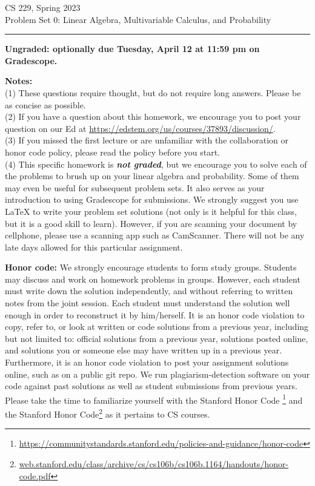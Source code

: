 \documentclass{article}
\newcommand{\ruleskip}{\bigskip\hrule\bigskip}
\begin{document}
\pagestyle{myheadings} 


{\huge
\noindent CS 229, Spring 2023\\
Problem Set 0: Linear Algebra, Multivariable Calculus, and Probability\\
}

\solutionstrue

\ruleskip

{\bf Ungraded: optionally due Tuesday, April 12 at 11:59 pm on Gradescope.}

{\bf Notes:} \\ (1) These questions require thought, but do not require long
answers. Please be as concise as possible. \\ (2) If you have a question about
this homework, we encourage you to post your question on our Ed at \url{https://edstem.org/us/courses/37893/discussion/}.  \\ (3) If you missed the
first lecture or are unfamiliar with the collaboration or honor code policy,
please read the policy before you start. \\ (4) This specific homework is {\bf{\emph{not graded}}}, but we encourage you
to solve each of the problems to brush up on your linear algebra and probability.
Some of them may even be useful for subsequent problem sets. It also
serves as your introduction to using Gradescope for submissions. We strongly suggest you use LaTeX to write your problem set solutions (not only is it helpful for this class, but it is a good skill to learn). However, if you are scanning your document by cellphone, please use a scanning app such as
CamScanner. There will not be any late days allowed for this particular assignment.
\smallskip




{\bf Honor code:} 
We strongly encourage students to form study groups. Students may discuss and work on homework problems in groups. However, each student must write down the solution independently, and without referring to written notes from the joint session. Each student must understand the solution well enough in order to reconstruct it by him/herself. It is an honor code violation to copy, refer to, or look at written or code solutions from a previous year, including but not limited to: official solutions from a previous year, solutions posted online, and solutions you or someone else may have written up in a previous year. Furthermore, it is an honor code violation to post your assignment solutions online, such as on a public git repo. We run plagiarism-detection software on your code against past solutions as well as student submissions from previous years. Please take the time to familiarize yourself with the Stanford Honor Code 
\footnote{\url{https://communitystandards.stanford.edu/policies-and-guidance/honor-code}} and the Stanford Honor Code\footnote{\url{web.stanford.edu/class/archive/cs/cs106b/cs106b.1164/handouts/honor-code.pdf}} as it pertains to CS courses.
\end{document}
